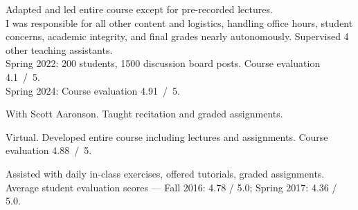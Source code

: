 \documentclass[11pt,letterpaper,serif]{moderncv}
\begin{document}
{
	\begin{adjustwidth}{.25in}{}
		Adapted and led entire course except for pre-recorded lectures.\\
		I was responsible for all other content and logistics, handling office hours, student concerns, academic integrity, and final grades nearly autonomously.
		Supervised 4 other teaching assistants.\\
		Spring 2022: 200 students, 1500 discussion board posts. Course evaluation 4.1~/~5.
		\\ Spring 2024: Course evaluation 4.91~/~5.
	\end{adjustwidth}
}

\smallskip

{
	\begin{adjustwidth}{.25in}{}
	With Scott Aaronson. Taught recitation and graded assignments.
	\end{adjustwidth}
}

\smallskip

{
	\begin{adjustwidth}{.25in}{}
		Virtual.
		Developed entire course including lectures and assignments.
		Course evaluation 4.88~/~5.
	\end{adjustwidth}
}

\smallskip

{
	\begin{adjustwidth}{.25in}{}
		Assisted with daily in-class exercises, offered tutorials, graded assignments. \newline
		Average student evaluation scores --- Fall 2016: 4.78 / 5.0; Spring 2017: 4.36 / 5.0.
	\end{adjustwidth}
}

\smallskip


\end{document}
